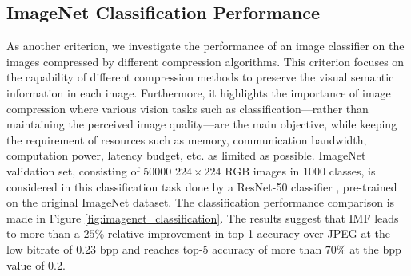 \subsection{ImageNet Classification Performance} \label{sec: imagenet Classification Performance}
As another criterion, we investigate the performance of an image classifier on the images compressed by different compression algorithms. 
This criterion focuses on the capability of different compression methods to preserve the visual semantic information in each image.
Furthermore, it highlights the importance of image compression where various vision tasks such as classification---rather than maintaining the perceived image quality---are the main objective, while keeping the requirement of resources such as memory, communication bandwidth, computation power, latency budget, etc. as limited as possible.
ImageNet \cite{deng2009imagenet} validation set, consisting of 50000 $224 \times 224$ RGB images in 1000 classes, is considered in this classification task done by a ResNet-50 classifier \cite{he2016deep}, pre-trained on the original ImageNet dataset.
The classification performance comparison is made in Figure \ref{fig:imagenet_classification}. 
The results suggest that IMF leads to more than a $25\%$ relative improvement in top-1 accuracy over JPEG at the low bitrate of 0.23 bpp and reaches top-5 accuracy of more than $70\%$ at the bpp value of 0.2. 



